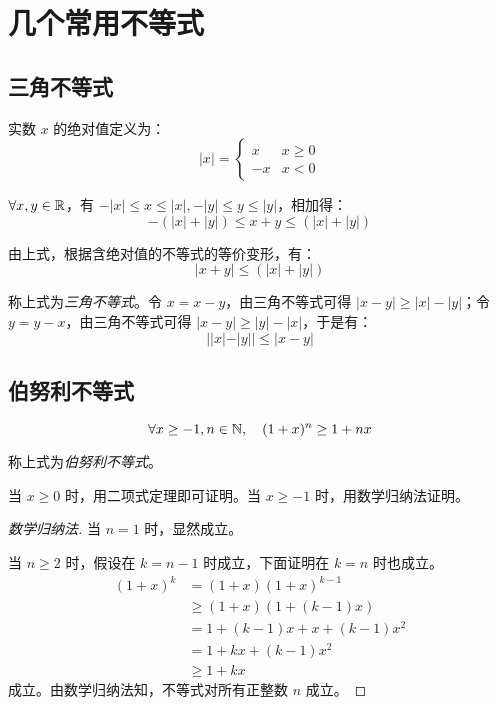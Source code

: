 
\section{几个常用不等式}

\subsection{三角不等式}

实数 $x$ 的绝对值定义为：
$$
|x| =
\begin{cases}
x & x \ge 0
\\
-x & x < 0
\end{cases}
$$

$\forall x,y \in \mathbb R$，有 $-|x| \le x \le |x|, -|y| \le y \le |y|$，相加得：
$$
-(|x| + |y|) \le x + y \le (|x| + |y|)
$$

由上式，根据含绝对值的不等式的等价变形，有：
$$
|x + y| \le (|x| + |y|)
$$

称上式为\emph{三角不等式}。令 $x = x - y$，由三角不等式可得 $|x - y| \ge |x| - |y|$；令 $y = y - x$，由三角不等式可得 $|x - y| \ge |y| - |x|$，于是有：
$$
||x| - |y|| \le |x - y|
$$

\subsection{伯努利不等式}

$$
\forall x \ge -1, n \in \mathbb N, \quad (1 + x)^n \ge 1 + nx
$$

称上式为\emph{伯努利不等式}。

当 $x \ge 0$ 时，用二项式定理即可证明。当 $x \ge -1$ 时，用数学归纳法证明。

\begin{proof}[数学归纳法]
	当 $n = 1$ 时，显然成立。

	当 $n \ge 2$ 时，假设在 $k = n - 1$ 时成立，下面证明在 $k = n$ 时也成立。
	$$
	\begin{aligned}
		(1 + x)^k &= (1 + x)(1 + x)^{k - 1}
		\\&\ge
		(1 + x)(1 + (k - 1)x)
		\\&=
		1 + (k - 1)x + x + (k - 1) x^2
		\\&=
		1 + kx + (k - 1) x^2
		\\&\ge
		1 + kx
	\end{aligned}
	$$
	成立。由数学归纳法知，不等式对所有正整数 $n$ 成立。
\end{proof}

